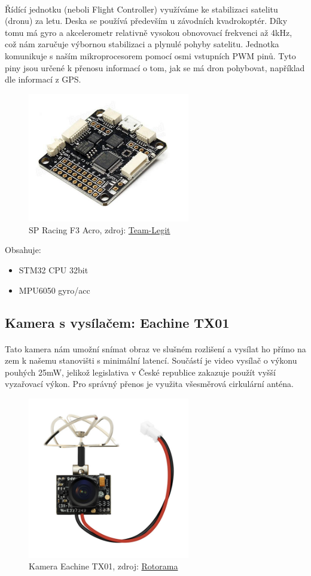 \documentclass[a4paper]{report}
\begin{document}
\paragraph{} Řídící jednotku (neboli Flight Controller) využíváme ke stabilizaci satelitu (dronu) za letu. Deska se používá především u závodních kvadrokoptér. Díky tomu má gyro a akcelerometr relativně vysokou obnovovací frekvenci až 4kHz, což nám zaručuje výbornou stabilizaci a plynulé pohyby satelitu. Jednotka komunikuje s naším mikroprocesorem pomocí osmi vstupních PWM pinů. Tyto piny jsou určené k přenosu informací o tom, jak se má dron pohybovat, například dle informací z GPS.
\begin{figure}[H]
\centering
\caption{SP Racing F3 Acro, zdroj: 
\href{http://team-legit.com/SP-Racing-F3-Flight-Controller-Acro-Standard-6DOF_p_660.html}{Team-Legit}}
\includegraphics[width=200pt]{Jednotka.png}
\end{figure}
Obsahuje:
\begin{itemize}
\item STM32 CPU 32bit
\item MPU6050 gyro/acc
\end{itemize}
\subsection{Kamera s vysílačem: Eachine TX01}
\paragraph{} Tato kamera nám umožní snímat obraz ve slušném rozlišení a vysílat ho přímo na zem k našemu stanovišti s minimální latencí. Součástí je video vysílač o výkonu pouhých 25mW, jelikož legislativa v České republice zakazuje použít vyšší vyzařovací výkon. Pro správný přenos je využita všesměrová cirkulární anténa. 
\begin{figure}[H]
\centering
\caption{Kamera Eachine TX01, zdroj:
\href{https://www.rotorama.cz/fpv/eachine-tx01}{Rotorama}}
\includegraphics[width=200pt]{Kamera.jpg}
\end{figure}
\end{document}

